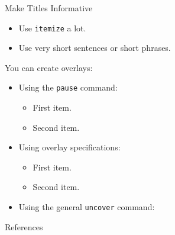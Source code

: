 \documentclass[smaller, aspectratio=169]{beamer}
\title[Paper Presentation]{\paperTitle}
\author{Alireza Heidari}
\institute{Simon Fraser University}
\date[December 2024]{\paperConference, \paperPublishedYear}
\begin{document}
\begin{frame}[plain]
    \titlepage
\end{frame}




\begin{frame}{Make Titles Informative}
  \begin{itemize}
      \item Use \texttt{itemize} a lot.
      \item Use very short sentences or short phrases.
  \end{itemize}
  You can create overlays:
  \begin{itemize}
      \item Using the \texttt{pause} command:
      \begin{itemize}
          \item First item.
          \pause
          \item Second item.
      \end{itemize}
      \item Using overlay specifications:
      \begin{itemize}
          \item<3-> First item.
          \item<4-> Second item.
      \end{itemize}
      \item Using the general \texttt{uncover} command:
      \begin{itemize}
      \end{itemize}
  \end{itemize}
\end{frame}


\begin{frame}[t]{References}
    \nocite{*}
    \small
    \printbibliography
\end{frame}
\end{document}
